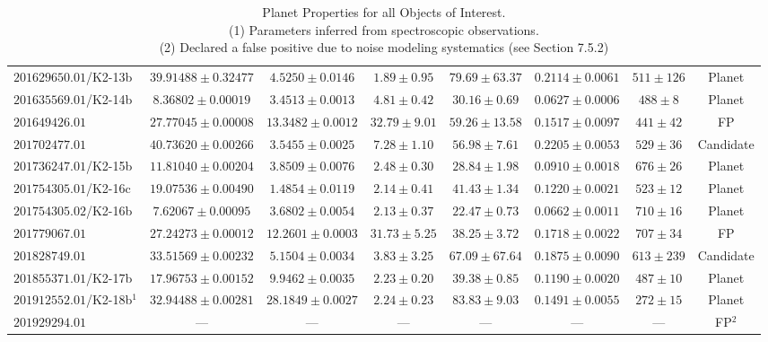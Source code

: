 \begin{landscape}
\begin{table}[hbt!]
\begin{center}
\begin{tabular}{lccccccc}
$201629650.01$/K2-13b & $39.91488 \pm {0.32477}$ & $4.5250 \pm {0.0146}$ & $1.89 \pm {0.95}$ & $79.69 \pm {63.37}$ & $0.2114 \pm {0.0061}$ & $511 \pm {126} $   & Planet \\
$201635569.01$/K2-14b & $8.36802 \pm {0.00019}$ & $3.4513 \pm {0.0013}$ & $4.81 \pm {0.42}$ & $30.16 \pm {0.69}$ & $0.0627 \pm {0.0006}$ & $488 \pm {8} $       & Planet \\
$201649426.01$ & $27.77045 \pm {0.00008}$ & $13.3482 \pm {0.0012}$ & $32.79 \pm {9.01}$ & $59.26 \pm {13.58}$ & $0.1517 \pm {0.0097}$ & $441 \pm {42} $  & FP \\
$201702477.01$ & $40.73620 \pm {0.00266}$ & $3.5455 \pm {0.0025}$ & $7.28 \pm {1.10}$ & $56.98 \pm {7.61}$ & $0.2205 \pm {0.0053}$ & $529 \pm {36} $     & Candidate \\
$201736247.01$/K2-15b & $11.81040 \pm {0.00204}$ & $3.8509 \pm {0.0076}$ & $2.48 \pm {0.30}$ & $28.84 \pm {1.98}$ & $0.0910 \pm {0.0018}$ & $676 \pm {26} $     & Planet \\
$201754305.01$/K2-16c & $19.07536 \pm {0.00490}$ & $1.4854 \pm {0.0119}$ & $2.14 \pm {0.41}$ & $41.43 \pm {1.34}$ & $0.1220 \pm {0.0021}$ & $523 \pm {12} $     & Planet \\
$201754305.02$/K2-16b & $7.62067 \pm {0.00095}$ & $3.6802 \pm {0.0054}$ & $2.13 \pm {0.37}$ & $22.47 \pm {0.73}$ & $0.0662 \pm {0.0011}$ & $710 \pm {16} $      & Planet \\
$201779067.01$ & $27.24273 \pm {0.00012}$ & $12.2601 \pm {0.0003}$ & $31.73 \pm {5.25}$ & $38.25 \pm {3.72}$ & $0.1718 \pm {0.0022}$ & $707 \pm {34} $   & FP \\
$201828749.01$ & $33.51569 \pm {0.00232}$ & $5.1504 \pm {0.0034}$ & $3.83 \pm {3.25}$ & $67.09 \pm {67.64}$ & $0.1875 \pm {0.0090}$ & $613 \pm {239} $   & Candidate \\
$201855371.01$/K2-17b & $17.96753 \pm {0.00152}$ & $9.9462 \pm {0.0035}$ & $2.23 \pm {0.20}$ & $39.38 \pm {0.85}$ & $0.1190 \pm {0.0020}$ & $487 \pm {10} $     & Planet \\
$201912552.01$/K2-18b$^1$ & $32.94488 \pm {0.00281}$ & $28.1849 \pm {0.0027}$ & $2.24 \pm {0.23}$ & $83.83 \pm {9.03}$ & $0.1491 \pm {0.0055}$ & $272 \pm {15}$ & Planet \\
$201929294.01$ & --- & --- & --- & --- & --- & --- & FP$^2$\\
\hline
\end{tabular}
\caption[Planet properties for all Objects of Interest]{Planet Properties for all Objects of Interest. \\
(1) Parameters inferred from spectroscopic observations. \\
(2) Declared a false positive due to noise modeling systematics (see Section 7.5.2)}
\end{center}
\label{Tab:Planets}
\end{table}
\end{landscape}
\clearpage
